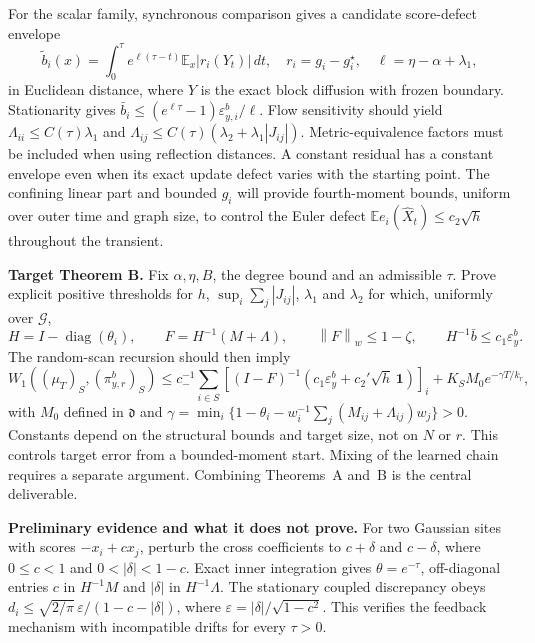 \documentclass[12pt,a4paper]{article}
\newcommand{\E}{\mathbb E}
\newcommand{\W}{W_1}
\newcommand{\pir}{\pi_{y,r}^{b}}
\newcommand{\epsb}{\varepsilon^{b}_{y}}
\newcommand{\normw}[1]{\left\|#1\right\|_w}
\begin{document}
For the scalar family, synchronous comparison gives a candidate score-defect envelope
\begin{equation}\label{eq:defect}
 \widetilde b_i(x)=\int_0^\tau e^{\ell(\tau-t)}\E_x|r_i(Y_t)|\,dt,
 \quad r_i=g_i-g_i^\star,\quad \ell=\eta-\alpha+\lambda_1,
\end{equation}
in Euclidean distance, where $Y$ is the exact block diffusion with frozen boundary. Stationarity gives $\bar b_i\leq (e^{\ell\tau}-1)\varepsilon^b_{y,i}/\ell$. Flow sensitivity should yield $\Lambda_{ii}\leq C(\tau)\lambda_1$ and $\Lambda_{ij}\leq C(\tau)(\lambda_2+\lambda_1|J_{ij}|)$. Metric-equivalence factors must be included when using reflection distances. A constant residual has a constant envelope even when its exact update defect varies with the starting point. The confining linear part and bounded $g_i$ will provide fourth-moment bounds, uniform over outer time and graph size, to control the Euler defect $\E e_i(\widehat X_t)\leq c_2\sqrt h$ throughout the transient.

\textbf{Target Theorem B.} Fix $\alpha,\eta,B$, the degree bound and an admissible $\tau$. Prove explicit positive thresholds for $h$, $\sup_i\sum_j|J_{ij}|$, $\lambda_1$ and $\lambda_2$ for which, uniformly over $\mathcal G$,
\[
 H=I-\operatorname{diag}(\theta_i),\qquad
 F=H^{-1}(M+\Lambda),\qquad \normw{F}\leq1-\zeta,
 \qquad H^{-1}\bar b\leq c_1\epsb.
\]
The random-scan recursion should then imply
\begin{equation}\label{eq:main}
 \W((\mu_T)_S,(\pir)_S)
 \leq c_-^{-1}\sum_{i\in S}\left[(I-F)^{-1}
 (c_1\epsb+c_2'\sqrt h\,\mathbf1)\right]_i
 +K_SM_0 e^{-\gamma T/k_r},
\end{equation}
with $M_0$ defined in $\mathfrak d$ and $\gamma=\min_i\{1-\theta_i-w_i^{-1}\sum_j(M_{ij}+\Lambda_{ij})w_j\}>0$. Constants depend on the structural bounds and target size, not on $N$ or $r$. This controls target error from a bounded-moment start. Mixing of the learned chain requires a separate argument. Combining Theorems~A and~B is the central deliverable.

\textbf{Preliminary evidence and what it does not prove.} For two Gaussian sites with scores $-x_i+cx_j$, perturb the cross coefficients to $c+\delta$ and $c-\delta$, where $0\leq c<1$ and $0<|\delta|<1-c$. Exact inner integration gives $\theta=e^{-\tau}$, off-diagonal entries $c$ in $H^{-1}M$ and $|\delta|$ in $H^{-1}\Lambda$. The stationary coupled discrepancy obeys $d_i\leq\sqrt{2/\pi}\,\varepsilon/(1-c-|\delta|)$, where $\varepsilon=|\delta|/\sqrt{1-c^2}$. This verifies the feedback mechanism with incompatible drifts for every $\tau>0$.
\end{document}
